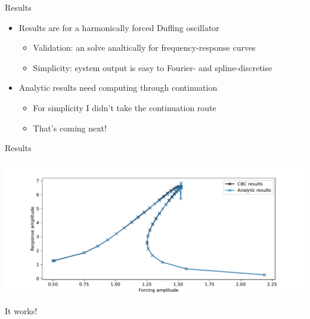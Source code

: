 \documentclass[presentation]{beamer}
\begin{document}
\begin{frame}[label={sec:orgfe3828f}]{Results}
\begin{itemize}
\item Results are for a harmonically forced Duffing oscillator
\begin{itemize}
\item Validation: an solve analtically for frequency-response curves
\item Simplicity: system output is easy to Fourier- and spline-discretise
\end{itemize}
\end{itemize}
\vfill
\begin{itemize}
\item Analytic results need computing through continuation
\begin{itemize}
\item For simplicity I didn't take the continuation route
\item That's coming next!
\end{itemize}
\end{itemize}
\end{frame}

\begin{frame}[label={sec:orgff4639a}]{Results}
\begin{center}
\includegraphics[width=.9\linewidth]{./comparison.pdf}
\end{center}

It works!
\end{frame}
\end{document}
